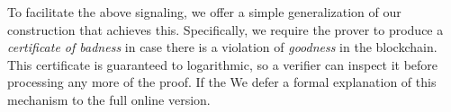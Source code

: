  To facilitate the above signaling, we offer a simple generalization of our
construction that achieves this.
Specifically, we require the prover to produce a
\textit{certificate of badness} in case there is a violation of
\textit{goodness} in the blockchain.
This certificate is guaranteed to logarithmic, so a verifier can inspect it before processing any more of the proof. If the 
We defer a formal explanation of this mechanism to the full online version.
